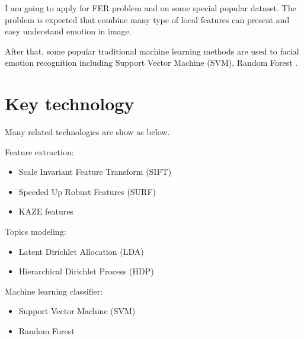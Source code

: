 \documentclass[12pt]{article}
\begin{document}
I am going to apply for FER problem and on some special popular dataset.
The problem is expected that combine many type of local features can present and easy understand emotion in image.

After that, some popular traditional machine learning methods are used to facial emotion recognition including Support Vector Machine \cite{suykens1999least} (SVM), Random Forest \cite{liaw2002classification}.

\section{Key technology}
Many related technologies are show as below.


Feature extraction:
\begin{itemize}
    \item Scale Invariant Feature Transform \cite{Lowe2004} (SIFT)
    \item Speeded Up Robust Features \cite{Bay06} (SURF)
    \item KAZE features \cite{alcantarilla2012kaze}
\end{itemize}


Topics modeling:
\begin{itemize}
    \item Latent Dirichlet Allocation \cite{blei2003latent, Blei2003} (LDA)
    \item Hierarchical Dirichlet Process \cite{teh2005sharing} (HDP)
\end{itemize}

Machine learning classifier:
\begin{itemize}
    \item Support Vector Machine \cite{suykens1999least} (SVM)
    \item Random Forest \cite{liaw2002classification}
\end{itemize}
\end{document}
